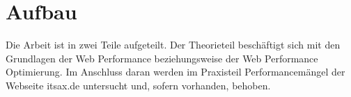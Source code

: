\section{Aufbau}
Die Arbeit ist in zwei Teile aufgeteilt. Der Theorieteil beschäftigt sich mit den Grundlagen der Web Performance beziehungsweise der Web Performance Optimierung. Im Anschluss daran werden im Praxisteil Performancemängel der Webseite itsax.de untersucht und, sofern vorhanden, behoben. 
